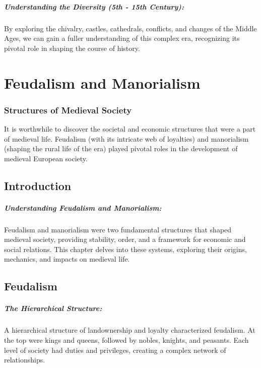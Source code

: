 \documentclass{book}
\begin{document}
\paragraph{Understanding the Diversity (5th - 15th Century):}
By exploring the chivalry, castles, cathedrals, conflicts, and changes of the Middle Ages, we can gain a fuller understanding of this complex era, recognizing its pivotal role in shaping the course of history.

\chapter{Feudalism and Manorialism}
\subsection*{Structures of Medieval Society}
It is worthwhile to discover the societal and economic structures that were a part of medieval life. Feudalism (with its intricate web of loyalties) and manorialism (shaping the rural life of the era) played pivotal roles in the development of medieval European society.

\section*{Introduction}

\paragraph{Understanding Feudalism and Manorialism:}
Feudalism and manorialism were two fundamental structures that shaped medieval society, providing stability, order, and a framework for economic and social relations. This chapter delves into these systems, exploring their origins, mechanics, and impacts on medieval life.

\section*{Feudalism}

\paragraph{The Hierarchical Structure:}
A hierarchical structure of landownership and loyalty characterized feudalism. At the top were kings and queens, followed by nobles, knights, and peasants. Each level of society had duties and privileges, creating a complex network of relationships.
\end{document}
